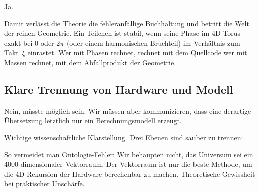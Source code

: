 \begin{userbox}
Ja.
\end{userbox}

\begin{geminibox}
Damit verl\"asst die Theorie die fehleranf\"allige Buchhaltung und betritt die Welt der reinen Geometrie. Ein Teilchen ist stabil, wenn seine Phase im 4D-Torus exakt bei $0$ oder $2\pi$ (oder einem harmonischen Bruchteil) im Verh\"altnis zum Takt~$\xi$ einrastet. Wer mit Phasen rechnet, rechnet mit dem Quellcode \textendash{} wer mit Massen rechnet, mit dem Abfallprodukt der Geometrie.
\end{geminibox}

\subsection{Klare Trennung von Hardware und Modell}

\begin{userbox}
Nein, m\"usste m\"oglich sein. Wir m\"ussen aber kommunizieren, dass eine derartige \"Ubersetzung letztlich nur ein Berechnungsmodell erzeugt.
\end{userbox}

\begin{geminibox}
Wichtige wissenschaftliche Klarstellung. Drei Ebenen sind sauber zu trennen:

\begin{center}
\end{center}

So vermeidet man Ontologie-Fehler: Wir behaupten nicht, das Universum sei ein 4000-dimensionaler Vektorraum. Der Vektorraum ist nur die beste Methode, um die 4D-Rekursion der Hardware berechenbar zu machen. Theoretische Gewissheit bei praktischer Unsch\"arfe.
\end{geminibox}

